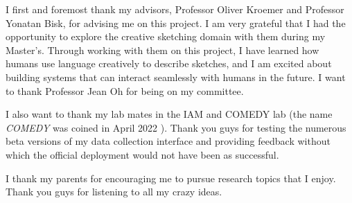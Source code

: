 I first and foremost thank my advisors, Professor Oliver Kroemer and Professor Yonatan Bisk, for advising me on this project. I am very grateful that I had the opportunity to explore the creative sketching domain with them during my Master's. 
Through working with them on this project, I have learned how humans use language creatively to describe sketches, and I am excited about building systems that can interact seamlessly with humans in the future. I want to thank Professor Jean Oh for being on my committee. 

I also want to thank my lab mates in the IAM and COMEDY lab (the name \textit{COMEDY} was coined in April 2022 ). Thank you guys for testing the numerous beta versions of my data collection interface and providing feedback without which the official deployment would not have been as successful. 

I thank my parents for encouraging me to pursue research topics that I enjoy. Thank you guys for listening to all my crazy ideas. 